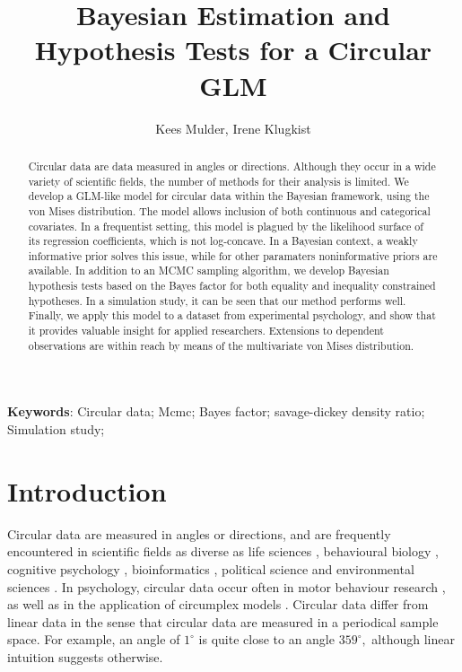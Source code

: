 \documentclass[11pt,a4paper]{article}\usepackage[]{graphicx}\usepackage[]{color}
\author{Kees Mulder, Irene Klugkist}
\title{Bayesian Estimation and Hypothesis Tests for a Circular GLM}
\begin{document}
\setcounter{topnumber}{1}

\maketitle




\begin{abstract}
Circular data are data measured in angles or directions. Although they occur in a wide variety of scientific fields, the number of methods for their analysis is limited.
We develop a GLM-like model for circular data within the Bayesian framework, using the von Mises distribution. The model allows inclusion of both continuous and categorical covariates. In a frequentist setting, this model is plagued by the likelihood surface of its regression coefficients, which is not log-concave. In a Bayesian context, a weakly informative prior solves this issue, while for other paramaters noninformative priors are available. In addition to an MCMC sampling algorithm, we develop Bayesian hypothesis tests based on the Bayes factor for both equality and inequality constrained hypotheses. In a simulation study, it can be seen that our method performs well. Finally, we apply this model to a dataset from experimental psychology, and show that it provides valuable insight for applied researchers. Extensions to dependent observations are within reach by means of the multivariate von Mises distribution.
\end{abstract}

\textbf{Keywords}: Circular data; Mcmc; Bayes factor; savage-dickey density ratio; Simulation study;

\section{Introduction}

Circular data are measured in angles or directions, and are frequently encountered in scientific fields as diverse as life sciences \citep{mardianew}, behavioural biology \citep{bulbert2015danger}, cognitive psychology \citep{kaas2006haptic}, bioinformatics \citep{mardia2008multivariate}, political science \citep{gill2010} and environmental sciences \citep{arnold2006recent}. In psychology, circular data occur often in motor behaviour research \citep{mechsner2001perceptual, mechsner2007bimanual, postma2008keep, baayen2012test}, as well as in the application of circumplex models \citep{Leary1957, gurtman2003circumplex, gurtman2009exploring}. Circular data differ from linear data in the sense that circular data are measured in a periodical sample space. For example, an angle of $1^{\circ}$ is quite close to an angle $359^{\circ},$ although linear intuition suggests otherwise.
\end{document}
